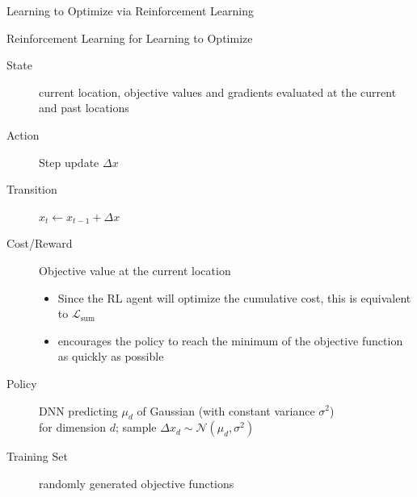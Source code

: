\begin{frame}[c]{Learning to Optimize via Reinforcement Learning\newline {}}

\begin{block}{Reinforcement Learning for Learning to Optimize}
\begin{description}
\item[State] current location, objective values and gradients evaluated at the current and past locations
\pause
\item[Action] Step update $\Delta x$
\pause
\item[Transition] $x_t \leftarrow x_{t-1} + \Delta x$
\pause
\item[Cost/Reward] Objective value at the current location
\begin{itemize}
\item Since the RL agent will optimize the cumulative cost, this is equivalent to $\mathcal{L}_{\text{sum}}$
\item encourages the policy to reach the minimum of the objective function as quickly as possible
\end{itemize}
\pause
\item[Policy] DNN predicting $\mu_d$ of Gaussian (with constant variance $\sigma^2$)\\ for dimension $d$; sample $\Delta x_d \sim \mathcal{N}(\mu_d, \sigma^2)$
\pause
\item[Training Set] randomly generated objective functions
\end{description}
\end{block}

\end{frame}
